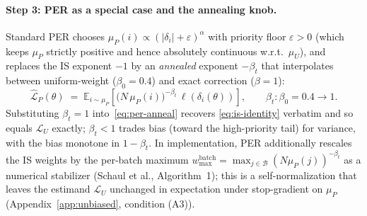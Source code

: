\paragraph{Step 3: PER as a special case and the annealing knob.}
Standard PER \citep{schaul2016per} chooses
$\mu_P(i)\propto(|\delta_i|+\varepsilon)^\alpha$ with priority floor
$\varepsilon\!>\!0$ (which keeps $\mu_P$ strictly positive and hence
absolutely continuous w.r.t.\ $\mu_U$), and replaces the IS exponent
$-1$ by an \emph{annealed} exponent $-\beta_t$ that interpolates
between uniform-weight ($\beta_0=0.4$) and exact correction ($\beta=1$):
\begin{equation}
\widehat{\mathcal{L}}_P(\theta) \;=\; \mathbb{E}_{i\sim\mu_P}\!\left[
\bigl(N\,\mu_P(i)\bigr)^{-\beta_t}\,\ell(\delta_i(\theta))
\right], \qquad \beta_t\colon \beta_0=0.4 \to 1.
\label{eq:per-anneal}
\end{equation}
Substituting $\beta_t\!=\!1$ into~\eqref{eq:per-anneal} recovers
\eqref{eq:is-identity} verbatim and so equals $\mathcal{L}_U$ exactly;
$\beta_t\!<\!1$ trades bias (toward the high-priority tail) for
variance, with the bias monotone in $1\!-\!\beta_t$. In implementation,
PER additionally rescales the IS weights by the per-batch maximum
$w_{\max}^{\text{batch}}\!=\!\max_{j\in\mathcal{B}}(N\mu_P(j))^{-\beta_t}$
as a numerical stabilizer (Schaul et al., Algorithm~1); this is a
self-normalization that leaves the estimand $\mathcal{L}_U$ unchanged in
expectation under stop-gradient on $\mu_P$ (Appendix~\ref{app:unbiased},
condition (A3)).

